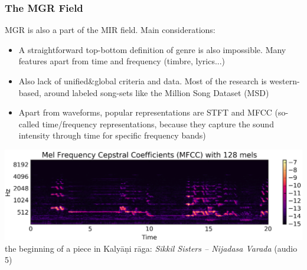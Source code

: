 \documentclass[hyperref={pdfpagelabels=false}]{beamer}
\begin{document}
     \begin{frame}
       \frametitle{The MGR Field}
       MGR is also a part of the MIR field. Main considerations\cite[p.17]{andres-bachelor}:
       \begin{itemize}
       \item A straightforward top-bottom definition of genre is also impossible. Many features apart from time and frequency (timbre, lyrics...)
       \item Also lack of unified\&global criteria and data. Most of the research is western-based, around labeled song-sets like the Million Song Dataset (MSD)
       \item Apart from waveforms, popular representations are STFT and MFCC (so-called time/frequency representations, because they capture the sound intensity through time for specific frequency bands)
       \end{itemize}
       \centering
          \includegraphics[scale=0.26]{flute_melgram.png}
         \\\scriptsize{the beginning of a piece in Kaly\=a\d{n}i r\=aga: {\it Sikkil Sisters -- Nijadasa Varada} (audio 5)}
     \end{frame}
\end{document}
